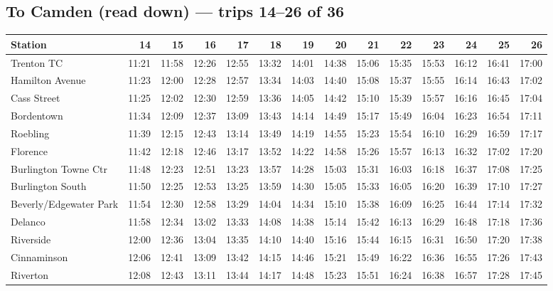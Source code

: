 \subsection*{To Camden (read down) --- trips 14--26 of 36}
\begin{center}\footnotesize\setlength{\tabcolsep}{3pt}\begin{tabular}{@{}lrrrrrrrrrrrrr@{}}\toprule
Station & 14 & 15 & 16 & 17 & 18 & 19 & 20 & 21 & 22 & 23 & 24 & 25 & 26 \\\midrule
Trenton TC & 11:21 & 11:58 & 12:26 & 12:55 & 13:32 & 14:01 & 14:38 & 15:06 & 15:35 & 15:53 & 16:12 & 16:41 & 17:00 \\
Hamilton Avenue & 11:23 & 12:00 & 12:28 & 12:57 & 13:34 & 14:03 & 14:40 & 15:08 & 15:37 & 15:55 & 16:14 & 16:43 & 17:02 \\
Cass Street & 11:25 & 12:02 & 12:30 & 12:59 & 13:36 & 14:05 & 14:42 & 15:10 & 15:39 & 15:57 & 16:16 & 16:45 & 17:04 \\
Bordentown & 11:34 & 12:09 & 12:37 & 13:09 & 13:43 & 14:14 & 14:49 & 15:17 & 15:49 & 16:04 & 16:23 & 16:54 & 17:11 \\
Roebling & 11:39 & 12:15 & 12:43 & 13:14 & 13:49 & 14:19 & 14:55 & 15:23 & 15:54 & 16:10 & 16:29 & 16:59 & 17:17 \\
Florence & 11:42 & 12:18 & 12:46 & 13:17 & 13:52 & 14:22 & 14:58 & 15:26 & 15:57 & 16:13 & 16:32 & 17:02 & 17:20 \\
Burlington Towne Ctr & 11:48 & 12:23 & 12:51 & 13:23 & 13:57 & 14:28 & 15:03 & 15:31 & 16:03 & 16:18 & 16:37 & 17:08 & 17:25 \\
Burlington South & 11:50 & 12:25 & 12:53 & 13:25 & 13:59 & 14:30 & 15:05 & 15:33 & 16:05 & 16:20 & 16:39 & 17:10 & 17:27 \\
Beverly/Edgewater Park & 11:54 & 12:30 & 12:58 & 13:29 & 14:04 & 14:34 & 15:10 & 15:38 & 16:09 & 16:25 & 16:44 & 17:14 & 17:32 \\
Delanco & 11:58 & 12:34 & 13:02 & 13:33 & 14:08 & 14:38 & 15:14 & 15:42 & 16:13 & 16:29 & 16:48 & 17:18 & 17:36 \\
Riverside & 12:00 & 12:36 & 13:04 & 13:35 & 14:10 & 14:40 & 15:16 & 15:44 & 16:15 & 16:31 & 16:50 & 17:20 & 17:38 \\
Cinnaminson & 12:06 & 12:41 & 13:09 & 13:42 & 14:15 & 14:46 & 15:21 & 15:49 & 16:22 & 16:36 & 16:55 & 17:26 & 17:43 \\
Riverton & 12:08 & 12:43 & 13:11 & 13:44 & 14:17 & 14:48 & 15:23 & 15:51 & 16:24 & 16:38 & 16:57 & 17:28 & 17:45 \\

\end{tabular}
\end{center}
